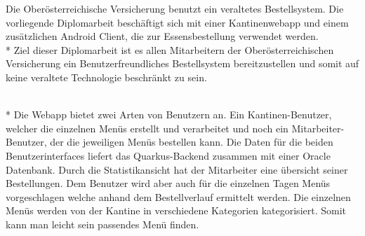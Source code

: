 Die Oberösterreichische Versicherung benutzt ein veraltetes Bestellsystem.
Die vorliegende Diplomarbeit beschäftigt sich mit einer Kantinenwebapp und einem zusätzlichen Android Client, die zur Essensbestellung
verwendet werden. 
\\*
Ziel dieser Diplomarbeit ist es allen Mitarbeitern der Oberösterreichischen Versicherung ein Benutzerfreundliches Bestellsystem
bereitzustellen und somit auf keine veraltete Technologie beschränkt zu sein. 

\\* 
Die Webapp bietet zwei Arten von Benutzern an.
Ein Kantinen-Benutzer, welcher die einzelnen Menüs erstellt und verarbeitet
und noch ein Mitarbeiter-Benutzer, der die jeweiligen Menüs bestellen kann.
Die Daten für die beiden Benutzerinterfaces liefert das Quarkus-Backend zusammen mit einer Oracle Datenbank.
 Durch die Statistikansicht hat der Mitarbeiter eine
übersicht seiner Bestellungen. Dem Benutzer wird aber auch für die einzelnen Tagen Menüs vorgeschlagen
welche anhand dem Bestellverlauf ermittelt werden. Die einzelnen Menüs werden von der Kantine in verschiedene Kategorien kategorisiert.
Somit kann man leicht sein passendes Menü finden. 
